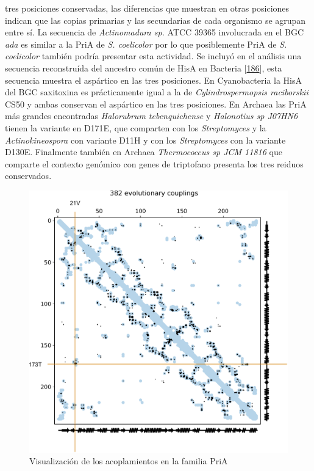 \documentclass[12pt,twoside]{reedthesis}
\begin{document}
  tres posiciones conservadas, las diferencias que muestran en otras
  posiciones indican que las copias primarias y las secundarias de cada
  organismo se agrupan entre sí. La secuencia de \emph{Actinomadura sp.}
  ATCC 39365 involucrada en el BGC \emph{ada} es similar a la PriA de
  \emph{S. coelicolor} por lo que posiblemente PriA de \emph{S.
  coelicolor} también podría presentar esta actividad. Se incluyó en el
  análisis una secuencia reconstruída del ancestro común de HisA en
  Bacteria {[}\protect\hyperlink{ref-plach_long-term_2016}{186}{]}, esta
  secuencia muestra el aspártico en las tres posiciones. En Cyanobacteria
  la HisA del BGC saxitoxina es prácticamente igual a la de
  \emph{Cylindrospermopsis raciborskii} CS50 y ambas conservan el
  aspártico en las tres posiciones. En Archaea las PriA más grandes
  encontradas \emph{Halorubrum tebenquichense} y \emph{Halonotius sp
  J07HN6} tienen la variante en D171E, que comparten con los
  \emph{Streptomyces} y la \emph{Actinokineospora} con variante D11H y con
  los \emph{Streptomyces} con la variante D130E. Finalmente también en
  Archaea \emph{Thermococcus sp JCM 11816} que comparte el contexto
  genómico con genes de triptofano presenta los tres reiduos conservados.
  
  \begin{figure}[h!tbp]
  \centering
  \includegraphics[angle = 0,scale = .5]{chapter4/Couplings/HIS4_STRCO_1-200/align/couplings.pdf}
  \caption[Visualización de los acoplamientos en la familia PriA]{\footnotesize{Visualización de los acoplamientos en la familia PriA}}
  \label{fig:couplings}
  \end{figure}
  
\end{document}
